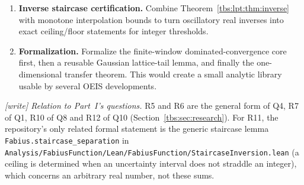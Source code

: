\documentclass[11pt,a4paper]{article}
\numberwithin{equation}{section}
\theoremstyle{definition}
\newcommand{\code}[1]{\texttt{#1}}
\begin{document}
\begin{enumerate}[label=\textbf{R\arabic*.},leftmargin=*]
logarithmic peak locations arising in concrete arrays, prove discrepancy
estimates strong enough to obtain effective versions of
\eqref{tbs:lpt:eq:phase-average}.
\item \textbf{Inverse staircase certification.} Combine
Theorem~\ref{tbs:lpt:thm:inverse} with monotone interpolation bounds to
turn oscillatory real inverses into exact ceiling/floor statements for
integer thresholds.
\item \textbf{Formalization.} Formalize the finite-window
dominated-convergence core first, then a reusable Gaussian lattice-tail
lemma, and finally the one-dimensional transfer theorem. This would
create a small analytic library usable by several OEIS developments.
\end{enumerate}

\emph{[write] Relation to Part~I's questions.} R5 and R6 are the general
form of Q4, R7 of Q1, R10 of Q8 and R12 of Q10
(Section~\ref{tbs:sec:research}). For R11, the repository's only related
formal statement is the generic staircase lemma
\code{Fabius.staircase\_separation} in
\nolinkurl{Analysis/FabiusFunction/Lean/FabiusFunction/StaircaseInversion.lean}
(a ceiling is determined when an uncertainty interval does not straddle
an integer), which concerns an arbitrary real number, not these sums.
\end{document}
